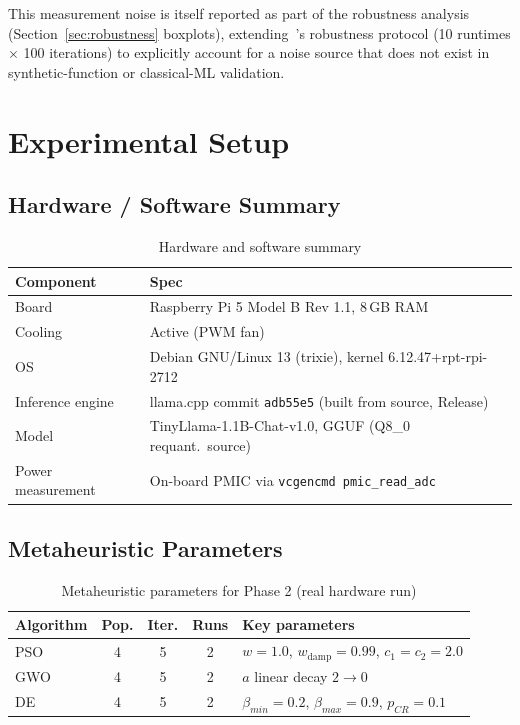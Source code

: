 \documentclass[journal]{IEEEtran}
\begin{document}
This measurement noise is itself reported as part of the robustness analysis (Section~\ref{sec:robustness} boxplots), extending~\cite{ref11}'s robustness protocol (10 runtimes $\times$ 100 iterations) to explicitly account for a noise source that does not exist in synthetic-function or classical-ML validation.

\section{Experimental Setup}
\label{sec:setup}

\subsection{Hardware / Software Summary}

\begin{table}[t]
\caption{Hardware and software summary}
\label{tab:hw-summary}
\centering
\begin{tabular}{@{}ll@{}}
\toprule
Component & Spec \\
\midrule
Board & Raspberry Pi 5 Model B Rev 1.1, 8\,GB RAM \\
Cooling & Active (PWM fan) \\
OS & Debian GNU/Linux 13 (trixie), kernel 6.12.47+rpt-rpi-2712 \\
Inference engine & llama.cpp commit \texttt{adb55e5} (built from source, Release) \\
Model & TinyLlama-1.1B-Chat-v1.0, GGUF (Q8\_0 requant.\ source) \\
Power measurement & On-board PMIC via \texttt{vcgencmd pmic\_read\_adc} \\
\bottomrule
\end{tabular}
\end{table}

\subsection{Metaheuristic Parameters}

\begin{table}[t]
\caption{Metaheuristic parameters for Phase 2 (real hardware run)}
\label{tab:meta-params}
\centering
\footnotesize
\begin{tabular}{@{}lcccl@{}}
\toprule
Algorithm & Pop. & Iter. & Runs & Key parameters \\
\midrule
PSO & 4 & 5 & 2 & $w{=}1.0$, $w_{\text{damp}}{=}0.99$, $c_1{=}c_2{=}2.0$ \\
GWO & 4 & 5 & 2 & $a$ linear decay $2\to0$ \\
DE  & 4 & 5 & 2 & $\beta_{min}{=}0.2$, $\beta_{max}{=}0.9$, $p_{CR}{=}0.1$ \\
\bottomrule
\end{tabular}
\end{table}
\end{document}

